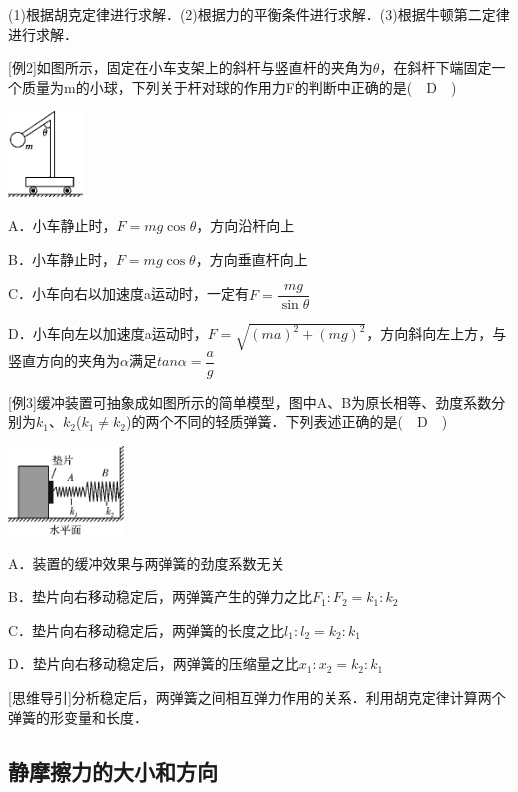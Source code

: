 (1)根据胡克定律进行求解．(2)根据力的平衡条件进行求解．(3)根据牛顿第二定律进行求解．

{[}例2{]}如图所示，固定在小车支架上的斜杆与竖直杆的夹角为$\theta$，在斜杆下端固定一个质量为m的小球，下列关于杆对球的作用力F的判断中正确的是(　D　)\begin{center}\includegraphics[width=0.78125in,height=0.89583in]{media/image46.png}\end{center}

A．小车静止时，$F=mg\cos \theta$，方向沿杆向上

B．小车静止时，$F=mg\cos \theta$，方向垂直杆向上

C．小车向右以加速度a运动时，一定有$F=\dfrac{mg}{\sin\theta}$

D．小车向左以加速度a运动时，$F=\sqrt{(ma)^2+(mg)^2}$，方向斜向左上方，与竖直方向的夹角为$\alpha$满足$tan\alpha=\dfrac{a}{g}$

{[}例3{]}缓冲装置可抽象成如图所示的简单模型，图中A、B为原长相等、劲度系数分别为$k_1$、$k_2$($k_1\neq k_2$)的两个不同的轻质弹簧．下列表述正确的是(　D　)

\begin{center}\includegraphics[width=1.20833in,height=0.92708in]{media/image47.png}\end{center}

A．装置的缓冲效果与两弹簧的劲度系数无关

B．垫片向右移动稳定后，两弹簧产生的弹力之比$F_1:F_2=k_1:k_2　$

C．垫片向右移动稳定后，两弹簧的长度之比$l_1:l_2=k_2:k_1$

D．垫片向右移动稳定后，两弹簧的压缩量之比$x_1:x_2=k_2:k_1$　

{[}思维导引{]}分析稳定后，两弹簧之间相互弹力作用的关系．利用胡克定律计算两个弹簧的形变量和长度．

\subsection{静摩擦力的大小和方向}

